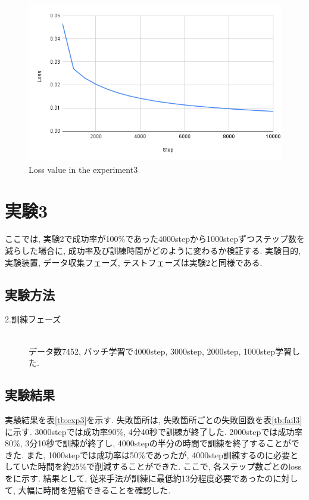 \newpage
\begin{figure}[h]
  \centering
  \includegraphics[keepaspectratio, scale=0.5]{images/exp3_10000.png}
  \caption{Loss value in the experiment3}
  \label{Fig:exp2.2-10000}
  \end{figure}

\newpage
\section{実験3}
ここでは, 実験2で成功率が100\%であった4000stepから1000stepずつステップ数を減らした場合に, 成功率及び訓練時間がどのように変わるか検証する. 実験目的, 実験装置, データ収集フェーズ, テストフェーズは実験2と同様である. 

\subsection{実験方法}
\begin{description}
  \item[2.訓練フェーズ]\mbox{}\\データ数7452, バッチ学習で4000step, 3000step, 2000step, 1000step学習した. 
\end{description}

\subsection{実験結果}
実験結果を表\ref{tb:exp3}を示す. 失敗箇所は, 失敗箇所ごとの失敗回数を表\ref{tb:fail3}に示す. 3000stepでは成功率90\%, 4分40秒で訓練が終了した. 2000stepでは成功率80\%, 3分10秒で訓練が終了し, 4000stepの半分の時間で訓練を終了することができた. また, 1000stepでは成功率は50\%であったが, 4000step訓練するのに必要としていた時間を約25\%で削減することができた. ここで, 各ステップ数ごとのlossをに示す. 結果として, 従来手法が訓練に最低約13分程度必要であったのに対して, 大幅に時間を短縮できることを確認した. 

